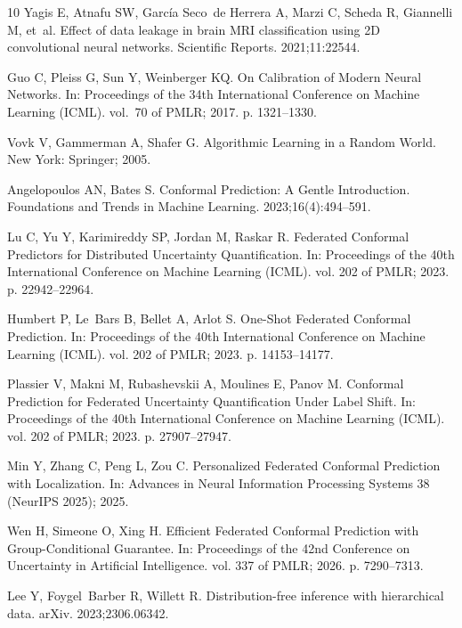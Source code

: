 \documentclass[VANCOUVER,Times1COL]{WileyNJDv5}
\begin{document}
\begin{thebibliography}{10}
Yagis E, Atnafu SW, Garc{\'i}a Seco~de Herrera A, Marzi C, Scheda R, Giannelli
  M, et~al.
\newblock Effect of data leakage in brain {MRI} classification using {2D}
  convolutional neural networks.
\newblock Scientific Reports. 2021;11:22544.

Guo C, Pleiss G, Sun Y, Weinberger KQ.
\newblock On Calibration of Modern Neural Networks.
\newblock In: Proceedings of the 34th International Conference on Machine
  Learning (ICML). vol.~70 of PMLR; 2017. p. 1321--1330.

Vovk V, Gammerman A, Shafer G.
\newblock Algorithmic Learning in a Random World.
\newblock New York: Springer; 2005.

Angelopoulos AN, Bates S.
\newblock Conformal Prediction: A Gentle Introduction.
\newblock Foundations and Trends in Machine Learning. 2023;16(4):494--591.

Lu C, Yu Y, Karimireddy SP, Jordan M, Raskar R.
\newblock Federated Conformal Predictors for Distributed Uncertainty
  Quantification.
\newblock In: Proceedings of the 40th International Conference on Machine
  Learning (ICML). vol. 202 of PMLR; 2023. p. 22942--22964.

Humbert P, Le~Bars B, Bellet A, Arlot S.
\newblock One-Shot Federated Conformal Prediction.
\newblock In: Proceedings of the 40th International Conference on Machine
  Learning (ICML). vol. 202 of PMLR; 2023. p. 14153--14177.

Plassier V, Makni M, Rubashevskii A, Moulines E, Panov M.
\newblock Conformal Prediction for Federated Uncertainty Quantification Under
  Label Shift.
\newblock In: Proceedings of the 40th International Conference on Machine
  Learning (ICML). vol. 202 of PMLR; 2023. p. 27907--27947.

Min Y, Zhang C, Peng L, Zou C.
\newblock Personalized Federated Conformal Prediction with Localization.
\newblock In: Advances in Neural Information Processing Systems 38 (NeurIPS
  2025); 2025.

Wen H, Simeone O, Xing H.
\newblock Efficient Federated Conformal Prediction with Group-Conditional
  Guarantee.
\newblock In: Proceedings of the 42nd Conference on Uncertainty in Artificial
  Intelligence. vol. 337 of PMLR; 2026. p. 7290--7313.

Lee Y, Foygel~Barber R, Willett R.
\newblock Distribution-free inference with hierarchical data.
\newblock arXiv. 2023;2306.06342.


\end{thebibliography}
\end{document}
